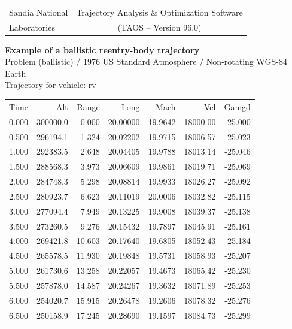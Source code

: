 \begin{minipage}{0.95\linewidth}
\centering
{\ttfamily\fontsize{6.15}{7.05}\selectfont
\begin{tabular*}{0.96\linewidth}{@{}l@{\extracolsep{\fill}}c@{}}
Sandia National & Trajectory Analysis \& Optimization Software\\[-1pt]
Laboratories & (TAOS -- Version 96.0)
\end{tabular*}

\vspace{1pt}
\noindent\makebox[0.96\linewidth][l]{\leaders\hbox{-}\hfill\kern0pt}
\vspace{3pt}

\textbf{Example of a ballistic reentry-body trajectory}\\[2pt]
Problem (ballistic) / 1976 US Standard Atmosphere / Non-rotating WGS-84 Earth\\[3pt]
Trajectory for vehicle: rv\\[3pt]

\setlength{\tabcolsep}{4.35pt}
\begin{tabular}{rrrrrrr}
Time & Alt & Range & Long & Mach & Vel & Gamgd\\
0.000 & 300000.0 & 0.000 & 20.00000 & 19.9642 & 18000.00 & -25.000\\
0.500 & 296194.1 & 1.324 & 20.02202 & 19.9715 & 18006.57 & -25.023\\
1.000 & 292383.5 & 2.648 & 20.04405 & 19.9788 & 18013.14 & -25.046\\
1.500 & 288568.3 & 3.973 & 20.06609 & 19.9861 & 18019.71 & -25.069\\
2.000 & 284748.3 & 5.298 & 20.08814 & 19.9933 & 18026.27 & -25.092\\
2.500 & 280923.7 & 6.623 & 20.11019 & 20.0006 & 18032.82 & -25.115\\
3.000 & 277094.4 & 7.949 & 20.13225 & 19.9008 & 18039.37 & -25.138\\
3.500 & 273260.5 & 9.276 & 20.15432 & 19.7897 & 18045.91 & -25.161\\
4.000 & 269421.8 & 10.603 & 20.17640 & 19.6805 & 18052.43 & -25.184\\
4.500 & 265578.5 & 11.930 & 20.19848 & 19.5731 & 18058.93 & -25.207\\
5.000 & 261730.6 & 13.258 & 20.22057 & 19.4673 & 18065.42 & -25.230\\
5.500 & 257878.0 & 14.587 & 20.24267 & 19.3632 & 18071.89 & -25.253\\
6.000 & 254020.7 & 15.915 & 20.26478 & 19.2606 & 18078.32 & -25.276\\
6.500 & 250158.9 & 17.245 & 20.28690 & 19.1597 & 18084.73 & -25.299\\
\end{tabular}
}
\end{minipage}
